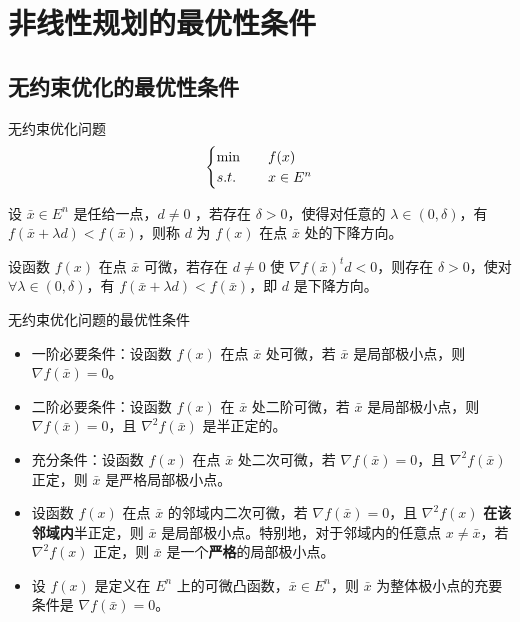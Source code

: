 \section{非线性规划的最优性条件}
\subsection{无约束优化的最优性条件}
无约束优化问题
\[
    \begin{cases}
        \min \quad &f(x)\\
        s.t. \quad &x \in E^n
    \end{cases}
\]
\begin{definition}[下降方向]
    设 $\bar{x} \in E^n$ 是任给一点，$d\neq 0$ ，若存在 $\delta > 0$，使得对任意的 $\lambda \in (0, \delta)$，有 $f(\bar{x} + \lambda d) < f(\bar{x})$，则称 $d$ 为 $f(x)$ 在点 $\bar{x}$ 处的下降方向。
\end{definition}

\begin{theorem}
    设函数 $f(x)$ 在点 $\bar{x}$ 可微，若存在 $d \neq 0$ 使 $\nabla f(\bar{x})^td < 0$，则存在 $\delta > 0$，使对 $\forall \lambda\in (0, \delta)$，有 $f(\bar{x} + \lambda d) < f(\bar{x})$，即 $d$ 是下降方向。
\end{theorem}

\begin{theorem}
    无约束优化问题的最优性条件\begin{itemize}
        \item 一阶必要条件：设函数 $f(x)$ 在点 $\bar{x}$ 处可微，若 $\bar{x}$ 是局部极小点，则 $\nabla f(\bar{x}) = 0$。
        \item 二阶必要条件：设函数 $f(x)$ 在 $\bar{x}$ 处二阶可微，若 $\bar{x}$ 是局部极小点，则 $\nabla f(\bar{x}) = 0$，且 $\nabla^2f(\bar{x})$ 是半正定的。
        \item 充分条件：设函数 $f(x)$ 在点 $\bar{x}$ 处二次可微，若 $\nabla f(\bar{x}) = 0$，且 $\nabla^2f(\bar{x})$ 正定，则 $\bar{x}$ 是严格局部极小点。
        \item 设函数 $f(x)$ 在点 $\bar{x}$ 的邻域内二次可微，若 $\nabla f(\bar{x}) = 0$，且 $\nabla^2f(x)$ \textbf{在该邻域内}半正定，则 $\bar{x}$ 是局部极小点。特别地，对于邻域内的任意点 $x\neq \bar{x}$，若 $\nabla^2f(x)$ 正定，则 $\bar{x}$ 是一个\textbf{严格}的局部极小点。
        \item 设 $f(x)$ 是定义在 $E^n$ 上的可微凸函数，$\bar{x} \in E^n$，则 $\bar{x}$ 为整体极小点的充要条件是 $\nabla f(\bar{x}) = 0$。
    \end{itemize}
\end{theorem}

